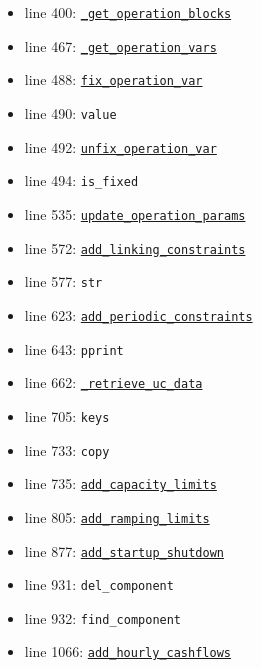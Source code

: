 \documentclass[11pt]{report}
\begin{document}
\begin{itemize}[leftmargin=*]
  \item line 400: \hyperref[def:pricetaker-price_taker_model.py:PriceTakerModel._get_operation_blocks:L445]{\texttt{\_get\_operation\_blocks}}
  \item line 467: \hyperref[def:pricetaker-price_taker_model.py:PriceTakerModel._get_operation_vars:L482]{\texttt{\_get\_operation\_vars}}
  \item line 488: \hyperref[def:pricetaker-price_taker_model.py:PriceTakerModel.fix_operation_var:L504]{\texttt{fix\_operation\_var}}
  \item line 490: \texttt{value}
  \item line 492: \hyperref[def:pricetaker-price_taker_model.py:PriceTakerModel.unfix_operation_var:L518]{\texttt{unfix\_operation\_var}}
  \item line 494: \texttt{is\_fixed}
  \item line 535: \hyperref[def:pricetaker-price_taker_model.py:PriceTakerModel.update_operation_params:L530]{\texttt{update\_operation\_params}}
  \item line 572: \hyperref[def:pricetaker-price_taker_model.py:PriceTakerModel.add_linking_constraints:L564]{\texttt{add\_linking\_constraints}}
  \item line 577: \texttt{str}
  \item line 623: \hyperref[def:pricetaker-price_taker_model.py:PriceTakerModel.add_periodic_constraints:L598]{\texttt{add\_periodic\_constraints}}
  \item line 643: \texttt{pprint}
  \item line 662: \hyperref[def:pricetaker-price_taker_model.py:PriceTakerModel._retrieve_uc_data:L628]{\texttt{\_retrieve\_uc\_data}}
  \item line 705: \texttt{keys}
  \item line 733: \texttt{copy}
  \item line 735: \hyperref[def:pricetaker-price_taker_model.py:PriceTakerModel.add_capacity_limits:L654]{\texttt{add\_capacity\_limits}}
  \item line 805: \hyperref[def:pricetaker-price_taker_model.py:PriceTakerModel.add_ramping_limits:L723]{\texttt{add\_ramping\_limits}}
  \item line 877: \hyperref[def:pricetaker-price_taker_model.py:PriceTakerModel.add_startup_shutdown:L813]{\texttt{add\_startup\_shutdown}}
  \item line 931: \texttt{del\_component}
  \item line 932: \texttt{find\_component}
  \item line 1066: \hyperref[def:pricetaker-price_taker_model.py:PriceTakerModel.add_hourly_cashflows:L897]{\texttt{add\_hourly\_cashflows}}

\end{itemize}
\end{document}
